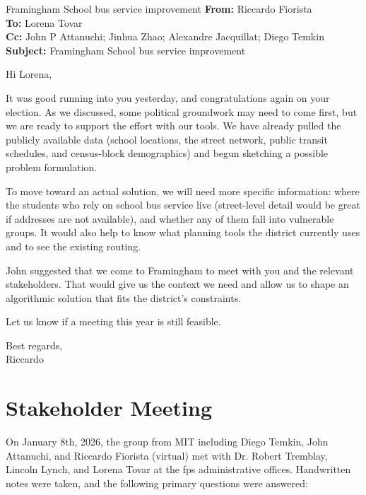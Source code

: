 {
\small
\begin{emailbox}{Framingham School bus service improvement}
    \textbf{From:} Riccardo Fiorista \\
    \textbf{To:} Lorena Tovar \\
    \textbf{Cc:} John P Attanuchi; Jinhua Zhao; Alexandre Jacquillat; Diego Temkin \\
    \textbf{Subject:} Framingham School bus service improvement

    \vspace{1em}
    Hi Lorena, \vspace{1em}

    It was good running into you yesterday, and congratulations again on your election. As we discussed, some political groundwork may need to come first, but we are ready to support the effort with our tools. We have already pulled the publicly available data (school locations, the street network, public transit schedules, and census-block demographics) and begun sketching a possible problem formulation. \vspace{1em}

    To move toward an actual solution, we will need more specific information: where the students who rely on school bus service live (street-level detail would be great if addresses are not available), and whether any of them fall into vulnerable groups. It would also help to know what planning tools the district currently uses and to see the existing routing. \vspace{1em}

    John suggested that we come to Framingham to meet with you and the relevant stakeholders. That would give us the context we need and allow us to shape an algorithmic solution that fits the district’s constraints. \vspace{1em}

    Let us know if a meeting this year is still feasible. \vspace{1em}
    
    Best regards, \\
    Riccardo
\end{emailbox}
}

\section{Stakeholder Meeting}

On January 8th, 2026, the group from MIT including Diego Temkin, John Attanuchi, and Riccardo Fiorista (virtual) met with Dr. Robert Tremblay, Lincoln Lynch, and Lorena Tovar at the \gls{fps} administrative offices. Handwritten notes were taken, and the following primary questions were answered:

